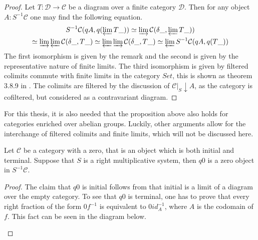     \begin{proof}
        Let $T:\mathcal{D}\rightarrow\mathcal{C}$ be a diagram over a finite category $\mathcal{D}$. Then for any object $A:S^{-1}\mathcal{C}$ one may find the following equation.
        \begin{multline*}
            S^{-1}\mathcal{C}(qA,q(\varprojlim T\_))\simeq \varinjlim\mathcal{C}(\delta\_,\varprojlim T\_))\\
            \simeq \varinjlim\varprojlim\mathcal{C}(\delta\_,T\_)\simeq \varprojlim\varinjlim\mathcal{C}(\delta\_,T\_)\simeq \varprojlim S^{-1}\mathcal{C}(qA,q(T\_))
        \end{multline*}
        The first isomorphism is given by the remark and the second is given by the representative nature of finite limits. The third isomorphism is given by filtered colimits commute with finite limits in the category $Set$, this is shown as theorem 3.8.9 in \cite{riehl}. The colimits are filtered by the discussion of $\mathcal{C}|_{S}\downarrow A$, as the category is cofiltered, but considered as a contravariant diagram.
    \end{proof}

    \begin{remark}
        For this thesis, it is also needed that the proposition above also holds for categories enriched over abelian groups. Luckily, other arguments allow for the interchange of filtered colimits and finite limits, which will not be discussed here.
    \end{remark}

    \begin{prop}
        Let $\mathcal{C}$ be a category with a zero, that is an object which is both initial and terminal. Suppose that $S$ is a right multiplicative system, then $q0$ is a zero object in $S^{-1}\mathcal{C}$.
    \end{prop}

    \begin{proof}
        The claim that $q0$ is initial follows from that initial is a limit of a diagram over the empty category. To see that $q0$ is terminal, one has to prove that every right fraction of the form $0f^{-1}$ is equivalent to $0id_A^{-1}$, where $A$ is the codomain of $f$. This fact can be seen in the diagram below.
        \begin{center}
        \end{center}
    \end{proof}

